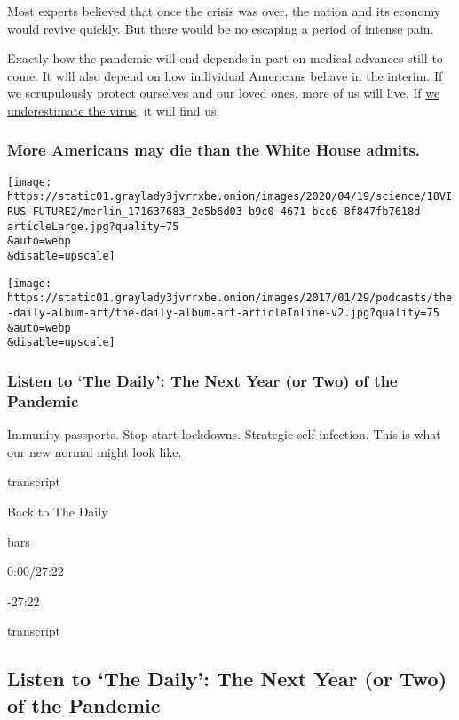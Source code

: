 Most experts believed that once the crisis was over, the nation and its
economy would revive quickly. But there would be no escaping a period of
intense pain.

Exactly how the pandemic will end depends in part on medical advances
still to come. It will also depend on how individual Americans behave in
the interim. If we scrupulously protect ourselves and our loved ones,
more of us will live. If
\href{https://www.nytimes3xbfgragh.onion/2020/04/14/us/bishop-gerald-glenn-coronavirus.html}{we
underestimate the virus}, it will find us.

\hypertarget{more-americans-may-die-than-the-white-house-admits}{%
\subsubsection{More Americans may die than the White House
admits.}\label{more-americans-may-die-than-the-white-house-admits}}

\texttt{[image: https://static01.graylady3jvrrxbe.onion/images/2020/04/19/science/18VIRUS-FUTURE2/merlin\_171637683\_2e5b6d03-b9c0-4671-bcc6-8f847fb7618d-articleLarge.jpg?quality=75\\\&auto=webp\\\&disable=upscale]}

\texttt{[image: https://static01.graylady3jvrrxbe.onion/images/2017/01/29/podcasts/the-daily-album-art/the-daily-album-art-articleInline-v2.jpg?quality=75\\\&auto=webp\\\&disable=upscale]}

\hypertarget{listen-to-the-daily-the-next-year-or-two-of-the-pandemic}{%
\subsubsection{Listen to `The Daily': The Next Year (or Two) of the
Pandemic}\label{listen-to-the-daily-the-next-year-or-two-of-the-pandemic}}

Immunity passports. Stop-start lockdowns. Strategic self-infection. This
is what our new normal might look like.

transcript

Back to The Daily

bars

0:00/27:22

-27:22

transcript

\hypertarget{listen-to-the-daily-the-next-year-or-two-of-the-pandemic-1}{%
\subsection{Listen to `The Daily': The Next Year (or Two) of the
Pandemic}\label{listen-to-the-daily-the-next-year-or-two-of-the-pandemic-1}}


